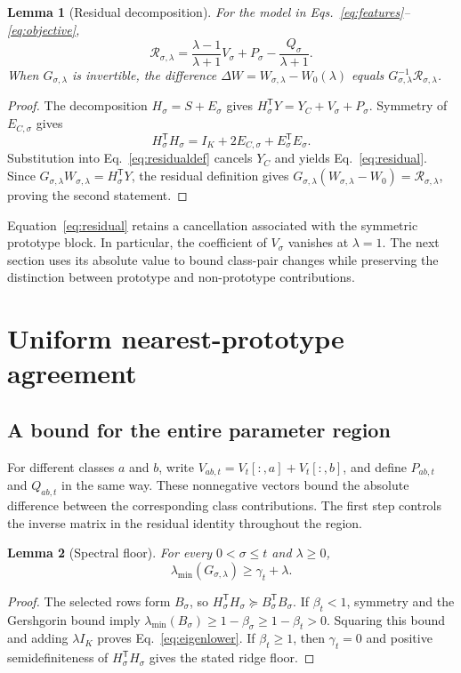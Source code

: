 \documentclass[preprint,12pt,authoryear]{elsarticle}
\newtheorem{lemma}{Lemma}
\newcommand{\tr}{\mathsf{T}}
\begin{document}
\begin{lemma}[Residual decomposition]
For the model in Eqs.~\eqref{eq:features}--\eqref{eq:objective},
\begin{equation}
 \mathcal R_{\sigma,\lambda}
 =\frac{\lambda-1}{\lambda+1}V_\sigma
   +P_\sigma-\frac{Q_\sigma}{\lambda+1}.
 \label{eq:residual}
\end{equation}
When $G_{\sigma,\lambda}$ is invertible, the difference $\Delta W=W_{\sigma,\lambda}-W_0(\lambda)$ equals $G_{\sigma,\lambda}^{-1}\mathcal R_{\sigma,\lambda}$.
\end{lemma}
\begin{proof}
The decomposition $H_\sigma=S+E_\sigma$ gives $H_\sigma^\tr Y=Y_C+V_\sigma+P_\sigma$. Symmetry of $E_{C,\sigma}$ gives
\[
 H_\sigma^\tr H_\sigma
 =I_K+2E_{C,\sigma}+E_\sigma^\tr E_\sigma.
\]
Substitution into Eq.~\eqref{eq:residualdef} cancels $Y_C$ and yields Eq.~\eqref{eq:residual}. Since $G_{\sigma,\lambda}W_{\sigma,\lambda}=H_\sigma^\tr Y$, the residual definition gives $G_{\sigma,\lambda}(W_{\sigma,\lambda}-W_0)=\mathcal R_{\sigma,\lambda}$, proving the second statement.
\end{proof}

Equation~\eqref{eq:residual} retains a cancellation associated with the symmetric prototype block. In particular, the coefficient of $V_\sigma$ vanishes at $\lambda=1$. The next section uses its absolute value to bound class-pair changes while preserving the distinction between prototype and non-prototype contributions.

\section{Uniform nearest-prototype agreement}
\subsection{A bound for the entire parameter region}
For different classes $a$ and $b$, write $V_{ab,t}=V_t[:,a]+V_t[:,b]$, and define $P_{ab,t}$ and $Q_{ab,t}$ in the same way. These nonnegative vectors bound the absolute difference between the corresponding class contributions. The first step controls the inverse matrix in the residual identity throughout the region.

\begin{lemma}[Spectral floor]
For every $0<\sigma\leq t$ and $\lambda\geq0$,
\begin{equation}
 \lambda_{\min}(G_{\sigma,\lambda})\geq\gamma_t+\lambda.
 \label{eq:eigenlower}
\end{equation}
\end{lemma}
\begin{proof}
The selected rows form $B_\sigma$, so $H_\sigma^\tr H_\sigma\succeq B_\sigma^\tr B_\sigma$. If $\beta_t<1$, symmetry and the Gershgorin bound imply $\lambda_{\min}(B_\sigma)\geq1-\beta_\sigma\geq1-\beta_t>0$. Squaring this bound and adding $\lambda I_K$ proves Eq.~\eqref{eq:eigenlower}. If $\beta_t\geq1$, then $\gamma_t=0$ and positive semidefiniteness of $H_\sigma^\tr H_\sigma$ gives the stated ridge floor.
\end{proof}
\end{document}
